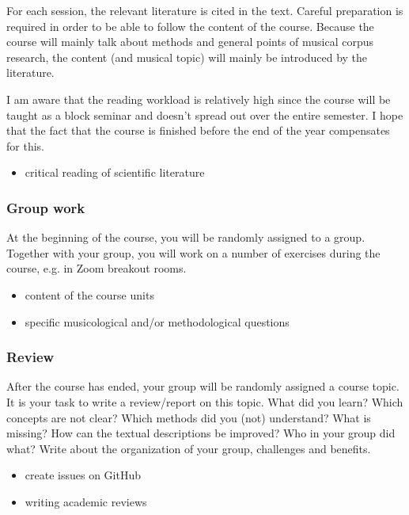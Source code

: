\documentclass[letterpaper,10pt,english]{sphinxmanual}
\begin{document}
For each session, the relevant literature is cited in the text.
Careful preparation is required in order to be able to follow the content of the course.
Because the course will mainly talk about methods and general points of musical corpus research,
the content (and musical topic) will mainly be introduced by the literature.

I am aware that the reading workload is relatively high since the course will be taught as a block seminar
and doesn’t spread out over the entire semester. I hope that the fact that the course is finished before the
end of the year compensates for this.
\begin{itemize}
\item {} 
critical reading of scientific literature

\end{itemize}
\subsubsection*{Group work}

At the beginning of the course, you will be randomly assigned to a group.
Together with your group, you will work on a number of exercises during the course,
e.g. in Zoom breakout rooms.
\begin{itemize}
\item {} 
content of the course units

\item {} 
specific musicological and/or methodological questions

\end{itemize}
\subsubsection*{Review}

After the course has ended, your group will be randomly assigned a course topic.
It is your task to write a review/report on this topic.
What did you learn? Which concepts are not clear? Which methods did you (not) understand?
What is missing? How can the textual descriptions be improved? Who in your group did what?
Write about the organization of your group, challenges and benefits.
\begin{itemize}
\item {} 
create issues on GitHub

\item {} 
writing academic reviews

\end{itemize}
\end{document}
